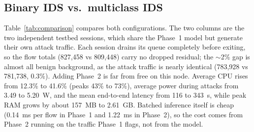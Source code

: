 \documentclass[conference]{IEEEtran}
\begin{document}
\subsection{Binary IDS vs.\ multiclass IDS}
\label{subsec:res_comp}

Table~\ref{tab:comparison} compares both configurations. The two columns are the two independent testbed sessions, which share the Phase~1 model but generate their own attack traffic. Each session drains its queue completely before exiting, so the flow totals (827{,}458 vs 809{,}448) carry no dropped residual; the $\sim$2\% gap is almost all benign background, as the attack traffic is nearly identical (783{,}928 vs 781{,}738, 0.3\%). Adding Phase~2 is far from free on this node. Average CPU rises from 12.3\% to 41.6\% (peaks 43\% to 73\%), average power during attacks from 3.49 to 5.20~W, and the mean end-to-end latency from 116 to 343~s, while peak RAM grows by about 157~MB to 2.61~GB. Batched inference itself is cheap (0.14~ms per flow in Phase~1 and 1.22~ms in Phase~2), so the cost comes from Phase~2 running on the traffic Phase~1 flags, not from the model.
\end{document}
